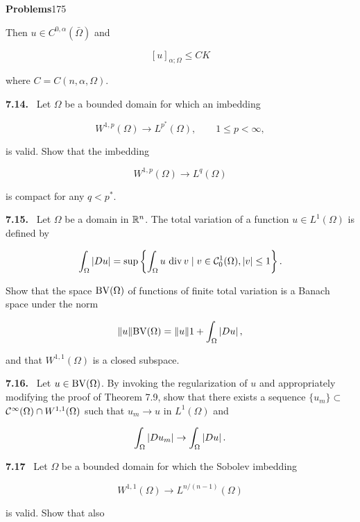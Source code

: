 


\setcounter{page}{175}
\noindent\textbf{Problems}\hfill 175

\bigskip

\noindent Then $u \in C^{0,\alpha}(\bar{\Omega})$ and

\[
[u]_{\alpha;\Omega} \leq CK
\]

\noindent where $C = C(n,\alpha,\Omega)$.

\bigskip

\noindent\textbf{7.14.} \ Let $\Omega$ be a bounded domain for which an imbedding

\[
W^{1,p}(\Omega)\to L^{p^*}(\Omega), \qquad 1 \leq p < \infty,
\]

\noindent is valid. Show that the imbedding

\[
W^{1,p}(\Omega)\to L^q(\Omega)
\]

\noindent is compact for any $q < p^*$.

\bigskip

\noindent\textbf{7.15.} \ Let $\Omega$ be a domain in $\mathbb{R}^n$. The total variation of a function $u \in L^1(\Omega)$ is
defined by

\[
\int_\Omega \left|Du\right| = \sup \left\{ \int_\Omega u \,\operatorname{div} v \mid v \in \mathcal{C}_0^1(\Omega), \left|v\right| \leq 1 \right\}.
\]

\noindent Show that the space $\operatorname{BV}(\Omega)$ of functions of finite total variation is a Banach space
under the norm

\[
\lVert u\rVert{\operatorname{BV}(\Omega)} = \lVert u\rVert{1} + \int_\Omega \left|Du\right|,
\]

\noindent and that $W^{1,1}(\Omega)$ is a closed subspace.

\bigskip

\noindent\textbf{7.16.} \ Let $u \in \operatorname{BV}(\Omega)$. By invoking the regularization of $u$ and appropriately
modifying the proof of Theorem 7.9, show that there exists a sequence $\{u_m\} \subset$
$\mathcal{C}^\infty(\Omega) \cap W^{1,1}(\Omega)$ such that $u_m \to u$ in $L^1(\Omega)$ and

\[
\int_\Omega \left|Du_m\right| \to \int_\Omega \left|Du\right|.
\]

\bigskip

\noindent\textbf{7.17} \ Let $\Omega$ be a bounded domain for which the Sobolev imbedding

\[
W^{1,1}(\Omega)\to L^{n/(n-1)}(\Omega)
\]

\noindent is valid. Show that also

